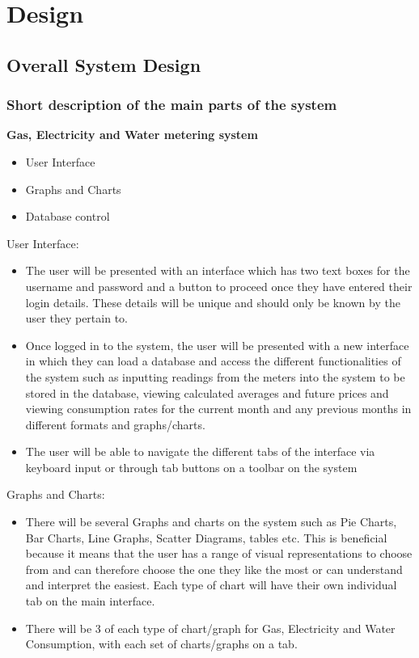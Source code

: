 \chapter{Design}

\section{Overall System Design}

\subsection{Short description of the main parts of the system}
\textbf{Gas, Electricity and Water metering system}
\begin{itemize}
\item{User Interface}

\item{Graphs and Charts}
\item{Database control}
\end{itemize}
User Interface:
\begin{itemize}
\item{The user will be presented with an interface which has two text boxes for the username and password and a button to proceed once they have entered their login details. These details will be unique and should only be known by the user they pertain to.}
\item{Once logged in to the system, the user will be presented with a new interface in which they can load a database and access the different functionalities of the system such as inputting readings from the meters into the system to be stored in the database, viewing calculated averages and future prices and viewing consumption rates for the current month and any previous months in different formats and graphs/charts.}
\item{The user will be able to navigate the different tabs of the interface via keyboard input or through tab buttons on a toolbar on the system}
\end{itemize}

Graphs and Charts:
\begin{itemize}
\item{There will be several Graphs and charts on the system such as Pie Charts, Bar Charts, Line Graphs, Scatter Diagrams, tables etc. This is beneficial because it means that the user has a range of visual representations to choose from and can therefore choose the one they like the most or can understand and interpret the easiest. Each type of chart will have their own individual tab on the main interface.}
\item{There will be 3 of each type of chart/graph for Gas, Electricity and Water Consumption, with each set of charts/graphs on a tab.}
\end{itemize}

